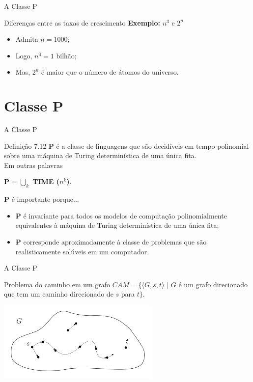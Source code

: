 \documentclass[xcolor=dvipsnames,table]{beamer}
\begin{document}
	\begin{frame}{A Classe P}
		\begin{block}{Diferenças entre as taxas de crescimento}
			{\bf Exemplo:} $n^3$ e $2^n$   
			\begin{itemize}
				\item Admita $n = 1000$;   
				\item Logo, $n^3 = 1$ bilhão;   
				\item Mas, $2^n$ é maior que o número de átomos do universo.
			\end{itemize}
		\end{block}
	\end{frame}

	\section{Classe P}
	
	\begin{frame}{A Classe P}
		\begin{block}{Definição 7.12}
			{\bf P} é a classe de linguagens que são decidíveis em tempo polinomial sobre uma máquina de Turing determinística de uma única fita. \\Em outras palavras
			\begin{center}
				{\bf P} = $\bigcup\limits_{k}$ {\bf TIME ($n^k$)}.
			\end{center}
		\end{block} \pause
		\begin{block}{{\bf P} é importante porque...} \pause
			\begin{itemize} 
				\item {\bf P} é invariante para todos os modelos de computação polinomialmente equivalentes à máquina de Turing determinística de uma única fita; \pause
				\item {\bf P} corresponde aproximadamente à classe de problemas que são realisticamente solúveis em um computador.
			\end{itemize}
		\end{block}
	\end{frame}
	
	\begin{frame}{A Classe P}
		\begin{block}{Problema do caminho em um grafo}
			$CAM = \{ \langle G, s, t \rangle \mbox{ | } G$ é um grafo direcionado que tem um caminho direcionado de $s$ para $t \}$.
		\end{block} \pause
		\begin{center}
			\includegraphics[width=8cm]{images/cam.png}
		\end{center}
	\end{frame}
	
\end{document}
